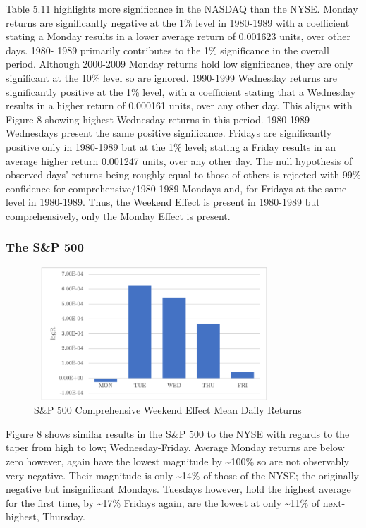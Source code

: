 \documentclass[11pt, english]{article}
\begin{document}
	Table 5.11 highlights more significance in the NASDAQ than the NYSE. Monday returns are significantly negative at the 1\% level in 1980-1989 with a coefficient stating a Monday results in a lower average return of 0.001623 units, over other days. 1980- 1989 primarily contributes to the 1\% significance in the overall period. Although 2000-2009 Monday returns hold low significance, they are only significant at the 10\% level so are ignored. 1990-1999 Wednesday returns are significantly positive at the 1\% level, with a coefficient stating that a Wednesday results in a higher return of 0.000161 units, over any other day. This aligns with Figure 8 showing highest Wednesday returns in this period. 1980-1989 Wednesdays present the same positive significance. Fridays are significantly positive only in 1980-1989 but at the 1\% level; stating a Friday results in an average higher return 0.001247 units, over any other day. The null hypothesis of observed days' returns being roughly equal to those of others is rejected with 99\% confidence for comprehensive/1980-1989 Mondays and, for Fridays at the same level in 1980-1989. Thus, the Weekend Effect is present in 1980-1989 but comprehensively, only the Monday Effect is present.

		\subsubsection{The S\&P 500}

	\begin{figure}[H]
        \begin{center}
                \includegraphics[width=9cm,height=5cm]{SP-WE1.png}
		\caption{S\&P 500 Comprehensive Weekend Effect Mean Daily Returns}
        \end{center}
        \end{figure}

	Figure 8 shows similar results in the S\&P 500 to the NYSE with regards to the taper from high to low; Wednesday-Friday. Average Monday returns are below zero however, again have the lowest magnitude by \~{}100\% so are not observably very negative. Their magnitude is only \~{}14\% of those of the NYSE; the originally negative but insignificant Mondays. Tuesdays however, hold the highest average for the first time, by \~{}17\% Fridays again, are the lowest at only \~{}11\% of next-highest, Thursday.
\end{document}
